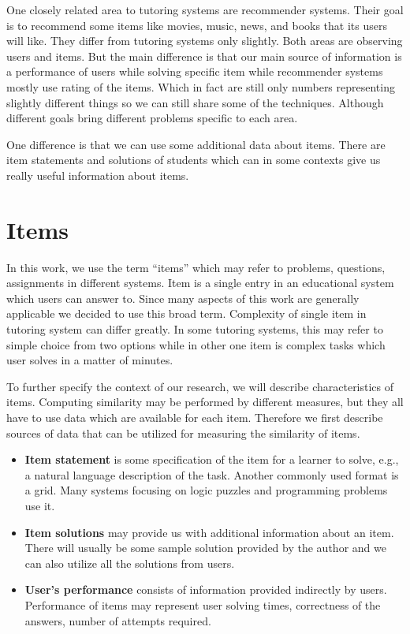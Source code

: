 \documentclass[
  digital, %
  table,   %
  nolof,     %
  nolot,     %
  nocover,
  color
]{fithesis3}
\begin{document}
One closely related area to tutoring systems are recommender systems. Their goal is to recommend some items like movies, music, news, and books that its users will like. They differ from tutoring systems only slightly. Both areas are observing users and items. But the main difference is that our main source of information is a performance of users while solving specific item while recommender systems mostly use rating of the items. Which in fact are still only numbers representing slightly different things so we can still share some of the techniques. Although different goals bring different problems specific to each area.


One difference is that we can use some additional data about items. There are item statements and solutions of students which can in some contexts give us really useful information about items.


\section{Items}\label{items}


In this work, we use the term ``items'' which may refer to problems, questions, assignments in different systems. Item is a single entry in an educational system which users can answer to. Since many aspects of this work are generally applicable we decided to use this broad term. Complexity of single item in tutoring system can differ greatly. In some tutoring systems, this may refer to simple choice from two options while in other one item is complex tasks which user solves in a matter of minutes.


To further specify the context of our research, we will describe characteristics of items. Computing similarity may be performed by different measures, but they all have to use data which are available for each item. Therefore we first describe sources of data that can be utilized for measuring the similarity of items.

\begin{itemize}
\item
  \textbf{Item statement} is some specification of the item for a learner to solve, e.g., a natural language description of the task. Another commonly used format is a grid. Many systems focusing on logic puzzles and programming problems use it.
\item
  \textbf{Item solutions} may provide us with additional information about an item. There will usually be some sample solution provided by the author and we can also utilize all the solutions from users.
\item
  \textbf{User's performance} consists of information provided indirectly by users. Performance of items may represent user solving times, correctness of the answers, number of attempts required.
\end{itemize}
\end{document}

